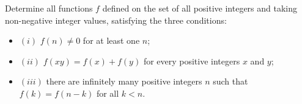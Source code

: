 Determine all functions $f$ defined on the set of all positive integers and taking non-negative integer values, satisfying the three conditions:
\begin{itemize}
	\item $(i)$ $f(n) \neq 0$ for at least one $n$;
	\item $(ii)$ $f(x y)=f(x)+f(y)$ for every positive integers $x$ and $y$;
	\item $(iii)$ there are infinitely many positive integers $n$ such that $f(k)=f(n-k)$ for all $k<n$.
\end{itemize}
